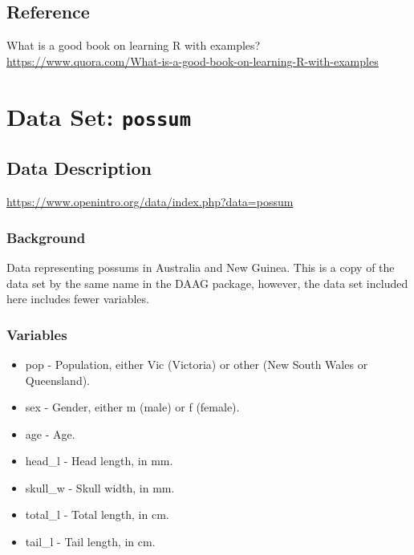 \documentclass[
]{book}
\begin{document}
\hypertarget{reference}{%
\section{Reference}\label{reference}}

What is a good book on learning R with examples? \url{https://www.quora.com/What-is-a-good-book-on-learning-R-with-examples}

\hypertarget{data-set-possum}{%
\chapter{\texorpdfstring{Data Set: \texttt{possum}}{Data Set: possum}}\label{data-set-possum}}

\hypertarget{data-description}{%
\section{Data Description}\label{data-description}}

\url{https://www.openintro.org/data/index.php?data=possum}

\hypertarget{background}{%
\subsection{Background}\label{background}}

Data representing possums in Australia and New Guinea. This is a copy of the data set by the same name in the DAAG package, however, the data set included here includes fewer variables.

\hypertarget{variables}{%
\subsection{Variables}\label{variables}}

\begin{itemize}
\item
  pop - Population, either Vic (Victoria) or other (New South Wales or Queensland).
\item
  sex - Gender, either m (male) or f (female).
\item
  age - Age.
\item
  head\_l - Head length, in mm.
\item
  skull\_w - Skull width, in mm.
\item
  total\_l - Total length, in cm.
\item
  tail\_l - Tail length, in cm.
\end{itemize}
\end{document}
